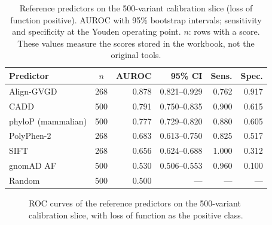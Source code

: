 \documentclass[10pt,journal,a4paper]{IEEEtran}
\def\rocCADD{(0.0000,0.0000) (0.0000,0.0300) (0.0000,0.0700) (0.0000,0.1700) (0.0025,0.1900) (0.0075,0.1900) (0.0200,0.2000) (0.0200,0.2300) (0.0300,0.2300) (0.0300,0.2400) (0.0375,0.2400) (0.0400,0.2400) (0.0425,0.2500) (0.0450,0.2500) (0.0525,0.2500) (0.0625,0.2500) (0.0650,0.2500) (0.0750,0.2500) (0.0750,0.2700) (0.0825,0.2800) (0.0875,0.2800) (0.0925,0.2900) (0.0950,0.3000) (0.1025,0.3000) (0.1125,0.3200) (0.1150,0.3200) (0.1175,0.3300) (0.1225,0.3400) (0.1225,0.3500) (0.1350,0.3500) (0.1375,0.4000) (0.1425,0.4200) (0.1525,0.4300) (0.1650,0.4700) (0.1675,0.4700) (0.1725,0.4800) (0.1750,0.4900) (0.1800,0.4900) (0.1925,0.5000) (0.1950,0.5100) (0.2050,0.5200) (0.2125,0.5300) (0.2175,0.5600) (0.2350,0.5700) (0.2450,0.6100) (0.2500,0.6400) (0.2550,0.6400) (0.2675,0.6700) (0.2700,0.6900) (0.2750,0.7000) (0.2825,0.7100) (0.2925,0.7400) (0.2975,0.7400) (0.3100,0.7600) (0.3150,0.7600) (0.3200,0.7700) (0.3225,0.7900) (0.3250,0.7900) (0.3325,0.8200) (0.3425,0.8400) (0.3500,0.8600) (0.3625,0.8600) (0.3700,0.8700) (0.3800,0.8700) (0.3825,0.8800) (0.3850,0.9000) (0.3900,0.9000) (0.4025,0.9000) (0.4050,0.9100) (0.4100,0.9200) (0.4225,0.9300) (0.4275,0.9300) (0.4300,0.9300) (0.4350,0.9300) (0.4375,0.9300) (0.4425,0.9300) (0.4450,0.9300) (0.4600,0.9300) (0.5150,0.9300) (0.5200,0.9300) (0.5725,0.9300) (0.5725,0.9400) (0.5800,0.9400) (0.5800,0.9500) (0.6025,0.9500) (0.6025,0.9600) (0.6075,0.9600) (0.6225,0.9600) (0.6250,0.9700) (0.6325,0.9700) (0.6325,0.9800) (0.6600,0.9800) (0.6650,0.9800) (0.6925,0.9800) (0.6975,0.9800) (0.7025,0.9800) (0.7075,0.9800) (0.7125,0.9800) (0.7175,0.9800) (0.7725,0.9800) (0.7775,0.9800) (0.9250,0.9800) (0.9250,0.9900) (0.9375,0.9900) (0.9375,1.0000) (0.9925,1.0000) (0.9975,1.0000) (1.0000,1.0000)}
\def\rocaGVD{(0.0000,0.0000) (0.0000,0.0476) (0.0049,0.0794) (0.0049,0.1746) (0.0098,0.1746) (0.0098,0.2222) (0.0146,0.2381) (0.0146,0.2857) (0.0341,0.2857) (0.0341,0.3810) (0.0341,0.4286) (0.0390,0.4286) (0.0390,0.4444) (0.0390,0.4762) (0.0390,0.4921) (0.0488,0.4921) (0.0488,0.5238) (0.0585,0.5238) (0.0585,0.5556) (0.0634,0.5714) (0.0634,0.6349) (0.0732,0.6349) (0.0732,0.6667) (0.0732,0.7302) (0.0780,0.7302) (0.0829,0.7460) (0.0829,0.7619) (0.1024,0.7619) (0.1122,0.7619) (0.1171,0.7619) (0.1268,0.7619) (0.1317,0.7619) (0.1317,0.7778) (0.1415,0.7778) (0.1463,0.7778) (0.1610,0.7778) (0.1707,0.7778) (0.1756,0.7778) (0.1756,0.7937) (0.1951,0.7937) (0.1951,0.8095) (0.2049,0.8095) (0.2146,0.8095) (0.2195,0.8095) (0.2195,0.8254) (0.2244,0.8254) (0.2341,0.8254) (0.2390,0.8571) (0.2488,0.8571) (0.2488,0.9048) (0.2585,0.9048) (0.2829,0.9048) (0.2927,0.9048) (0.3268,0.9048) (0.3317,0.9048) (0.3512,0.9048) (0.3561,0.9048) (0.3707,0.9048) (0.3805,0.9048) (0.3951,0.9048) (0.4146,0.9048) (0.4439,0.9048) (0.4634,0.9048) (0.5171,0.9048) (0.5171,0.9206) (0.5220,0.9206) (0.5220,0.9365) (0.5366,0.9365) (0.5512,0.9365) (0.5561,0.9365) (0.5707,0.9365) (0.5951,0.9365) (0.6049,0.9365) (0.6244,0.9365) (0.6341,0.9365) (0.6585,0.9365) (0.6585,0.9524) (0.6732,0.9524) (0.6878,0.9524) (0.7122,0.9524) (0.7268,0.9683) (0.7317,0.9683) (0.7463,0.9683) (0.7463,0.9841) (0.7561,0.9841) (0.7756,0.9841) (0.8000,0.9841) (0.8390,0.9841) (0.8488,0.9841) (0.8585,0.9841) (0.8585,1.0000) (0.8976,1.0000) (0.9073,1.0000) (0.9220,1.0000) (0.9268,1.0000) (0.9366,1.0000) (0.9463,1.0000) (0.9707,1.0000) (1.0000,1.0000)}
\def\rocphyloP{(0.0000,0.0000) (0.0400,0.1700) (0.1100,0.3300) (0.1175,0.3300) (0.2025,0.5200) (0.3950,0.8800) (0.4100,0.8800) (0.4400,0.8800) (0.4475,0.8800) (0.4500,0.9000) (0.4575,0.9000) (0.4600,0.9200) (0.4900,0.9200) (0.5025,0.9300) (0.5550,0.9300) (0.5650,0.9500) (0.5675,0.9700) (0.5900,0.9700) (0.6050,0.9700) (0.7325,0.9700) (0.7450,0.9800) (0.7825,0.9800) (0.7875,0.9900) (0.8400,0.9900) (0.8450,1.0000) (0.9725,1.0000) (0.9775,1.0000) (1.0000,1.0000)}
\def\rocPolyPhen2{(0.0000,0.0000) (0.0098,0.0000) (0.0341,0.0159) (0.0488,0.0476) (0.0537,0.0476) (0.0537,0.0794) (0.0878,0.1270) (0.1024,0.1429) (0.1073,0.1587) (0.1317,0.1746) (0.1317,0.1905) (0.1415,0.2381) (0.1561,0.2381) (0.1707,0.3175) (0.1756,0.3175) (0.1902,0.3333) (0.1951,0.3333) (0.1951,0.3810) (0.1951,0.3968) (0.2049,0.3968) (0.2293,0.4127) (0.2537,0.4444) (0.2585,0.4444) (0.2780,0.4921) (0.2829,0.5714) (0.2878,0.5714) (0.2976,0.5873) (0.2976,0.6349) (0.3024,0.6349) (0.3512,0.6349) (0.3512,0.6508) (0.3610,0.6508) (0.3610,0.6984) (0.3854,0.7143) (0.4000,0.7143) (0.4049,0.7143) (0.4146,0.7143) (0.4195,0.7143) (0.4244,0.7302) (0.4293,0.7302) (0.4341,0.7460) (0.4390,0.7460) (0.4634,0.7460) (0.4683,0.7460) (0.4683,0.7619) (0.4732,0.7619) (0.4829,0.7619) (0.4829,0.8254) (0.4976,0.8254) (0.5024,0.8254) (0.5268,0.8571) (0.5366,0.8571) (0.5366,0.8730) (0.5512,0.8730) (0.5610,0.8730) (0.5756,0.8730) (0.5756,0.8889) (0.5854,0.8889) (0.6098,0.8889) (0.6098,0.9048) (0.6195,0.9048) (0.6390,0.9048) (0.6439,0.9048) (0.6439,0.9206) (0.6537,0.9206) (0.6634,0.9206) (0.6732,0.9206) (0.6829,0.9206) (0.7171,0.9206) (0.7268,0.9206) (0.7366,0.9206) (0.7463,0.9206) (0.7512,0.9365) (0.7854,0.9365) (0.7951,0.9365) (0.8000,0.9365) (0.8146,0.9365) (0.8244,0.9365) (0.8341,0.9365) (0.8585,0.9365) (0.8585,0.9524) (0.8780,0.9524) (0.8927,0.9524) (0.8927,0.9683) (0.9122,0.9683) (0.9122,0.9841) (0.9415,0.9841) (0.9415,1.0000) (0.9561,1.0000) (0.9659,1.0000) (0.9805,1.0000) (1.0000,1.0000)}
\def\rocSIFT{(0.0000,0.0000) (0.6878,1.0000) (0.7463,1.0000) (0.7805,1.0000) (0.8049,1.0000) (0.8244,1.0000) (0.8341,1.0000) (0.8537,1.0000) (0.8634,1.0000) (0.8683,1.0000) (0.8878,1.0000) (0.9073,1.0000) (0.9220,1.0000) (0.9317,1.0000) (0.9463,1.0000) (0.9610,1.0000) (0.9902,1.0000) (1.0000,1.0000)}
\begin{document}
\begin{table}[!t]
\caption{Reference predictors on the 500-variant calibration slice (loss of function positive). AUROC with 95\% bootstrap intervals; sensitivity and specificity at the Youden operating point. $n$: rows with a score. These values measure the scores stored in the workbook, not the original tools.}
\label{tab:baselines}
\centering
\footnotesize
\setlength{\tabcolsep}{4pt}
\begin{tabular}{@{}lcrrrr@{}}
\toprule
Predictor & $n$ & AUROC & 95\% CI & Sens. & Spec. \\
\midrule
Align-GVGD & 268 & 0.878 & 0.821--0.929 & 0.762 & 0.917 \\
CADD & 500 & 0.791 & 0.750--0.835 & 0.900 & 0.615 \\
phyloP (mammalian) & 500 & 0.777 & 0.729--0.820 & 0.880 & 0.605 \\
PolyPhen-2 & 268 & 0.683 & 0.613--0.750 & 0.825 & 0.517 \\
SIFT & 268 & 0.656 & 0.624--0.688 & 1.000 & 0.312 \\
gnomAD AF & 500 & 0.530 & 0.506--0.553 & 0.960 & 0.100 \\
\midrule
Random & 500 & 0.500 & --- & --- & --- \\
\bottomrule
\end{tabular}
\end{table}

\begin{figure}[!t]
\centering
{}
\caption{ROC curves of the reference predictors on the 500-variant calibration slice, with loss of function as the positive class.}
\label{fig:roc}
\end{figure}
\end{document}
